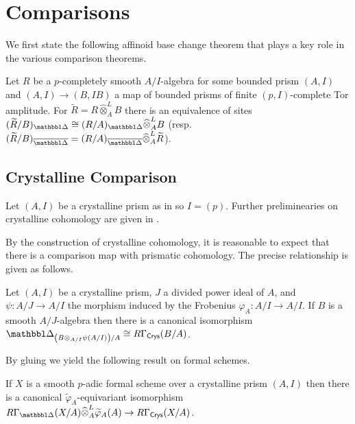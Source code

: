 \section{Comparisons}\label{sec: comparisons}
We first state the following affinoid base change theorem that plays a key role in the various comparison theorems. 
\begin{theorem}\label{thm: affinoid base change}
    Let $R$ be a $p$-completely smooth $A/I$-algebra for some bounded prism $(A,I)$ and $(A,I)\to(B,IB)$ a map of bounded prisms of finite $(p,I)$-complete Tor amplitude. For $\widetilde{R}=R\widehat{\otimes}^{L}_{A}B$ there is an equivalence of sites $(\widetilde{R}/B)_{\prism}\cong(R/A)_{\prism}\widehat{\otimes}^{L}_{A}B$ (resp. $(\widetilde{R}/B)_{\overline{\prism}}=(R/A)_{\overline{\prism}}\widehat{\otimes}^{L}_{A}\widetilde{R}$).
\end{theorem}
\subsection{Crystalline Comparison}\label{subsec: crystalline comparison}
Let $(A,I)$ be a crystalline prism as in  so $I=(p)$. Further preliminearies on crystalline cohomology are given in . 

By the construction of crystalline cohomology, it is reasonable to expect that there is a comparison map with prismatic cohomology. The precise relationship is given as follows. 
\begin{theorem}\label{thm: affine crystalline comparison}
    Let $(A,I)$ be a crystalline prism, $J$ a divided power ideal of $A$, and $\psi:A/J\to A/I$ the morphism induced by the Frobenius $\varphi_{A}:A/I\to A/I$. If $B$ is a smooth $A/J$-algebra then there is a canonical isomorphism $\prism_{\left(B\otimes_{A/I}\psi(A/I)\right)/A}\cong R\Gamma_{\Crys}(B/A)$. 
\end{theorem}
By gluing we yield the following result on formal schemes. 
\begin{theorem}\label{thm: global cyrstalline comparison}
    If $X$ is a smooth $p$-adic formal scheme over a crystalline prism $(A, I)$ then there is a canonical $\widetilde{\varphi}_{A}$-equivariant isomorphism $R\Gamma_{\prism}(X/A)\widehat{\otimes}^{L}_{A}\widetilde{\varphi}_{A}(A)\to R\Gamma_{\Crys}(X/A)$.
\end{theorem}
